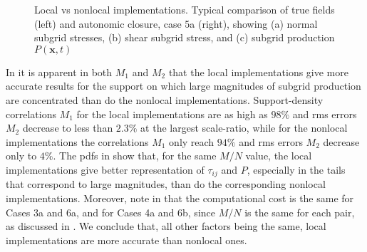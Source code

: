 %
\begin{figure}
	\centering %
	\label{F:NG2a}
\end{figure}
%
\begin{figure}
	\ContinuedFloat
	\centering %
	\label{F:NG2b}
\end{figure}
%
\begin{figure}
	\ContinuedFloat
	\centering %
	\label{F:NG2c}
\end{figure}
%
\begin{figure}
	\ContinuedFloat
	\caption{Local vs nonlocal implementations. Typical comparison of  true fields (left) and autonomic closure, case 5a (right), showing (a) normal subgrid stresses, (b) shear subgrid stress, and (c) subgrid production $P(\mathbf{x},t)$}
	\label{F:NG2}
\end{figure}
%
%

In  it is apparent in both $M_1$  and $M_2$  that the local implementations give more accurate results for the support on which large magnitudes of subgrid production are concentrated than do the nonlocal implementations. Support-density correlations $M_1$ for the local implementations are as high as $98\%$ and rms errors $M_2$  decrease to less than $2.3\%$  at the largest scale-ratio, while for the nonlocal implementations the correlations $M_1$  only reach $94\%$ and rms errors $M_2$  decrease only to $4\%$. The pdfs in   show that, for the same $M/N$  value, the local implementations give better representation of  $\tau_{ij}$ and $P$, especially in the tails that correspond to large magnitudes, than do the corresponding nonlocal implementations. Moreover, note in  that the computational cost is the same for Cases 3a and 6a, and for Cases 4a and 6b, since  $M/N$ is the same for each pair, as discussed in . We conclude that, all other factors being the same, local implementations are more accurate than nonlocal ones. 

